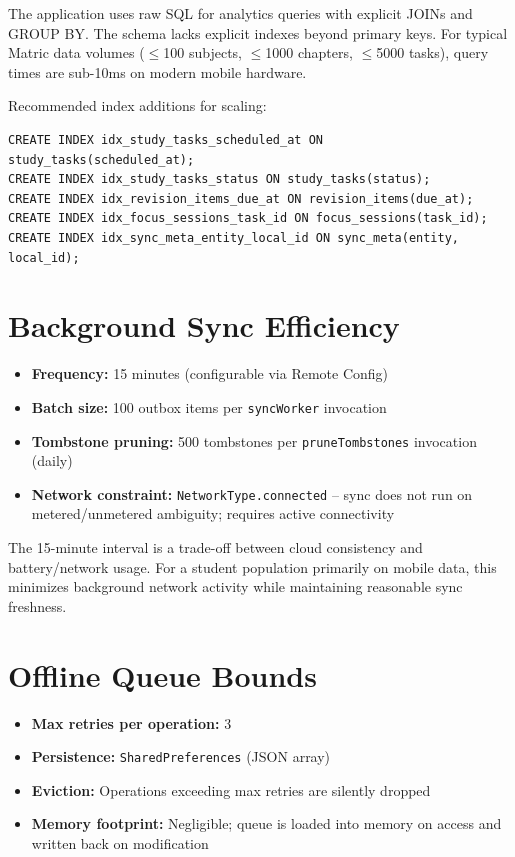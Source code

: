 \documentclass[12pt,a4paper,openany]{report}
\begin{document}
The application uses raw SQL for analytics queries with explicit JOINs and GROUP BY. The schema lacks explicit indexes beyond primary keys. For typical Matric data volumes ($\le$100 subjects, $\le$1000 chapters, $\le$5000 tasks), query times are sub-10ms on modern mobile hardware.

Recommended index additions for scaling:
\begin{verbatim}
CREATE INDEX idx_study_tasks_scheduled_at ON study_tasks(scheduled_at);
CREATE INDEX idx_study_tasks_status ON study_tasks(status);
CREATE INDEX idx_revision_items_due_at ON revision_items(due_at);
CREATE INDEX idx_focus_sessions_task_id ON focus_sessions(task_id);
CREATE INDEX idx_sync_meta_entity_local_id ON sync_meta(entity, local_id);
\end{verbatim}

\section{Background Sync Efficiency}

\begin{itemize}[leftmargin=*]
  \item \textbf{Frequency:} 15 minutes (configurable via Remote Config)
  \item \textbf{Batch size:} 100 outbox items per \texttt{syncWorker} invocation
  \item \textbf{Tombstone pruning:} 500 tombstones per \texttt{pruneTombstones} invocation (daily)
  \item \textbf{Network constraint:} \texttt{NetworkType.connected} -- sync does not run on metered/unmetered ambiguity; requires active connectivity
\end{itemize}

The 15-minute interval is a trade-off between cloud consistency and battery/network usage. For a student population primarily on mobile data, this minimizes background network activity while maintaining reasonable sync freshness.

\section{Offline Queue Bounds}

\begin{itemize}[leftmargin=*]
  \item \textbf{Max retries per operation:} 3
  \item \textbf{Persistence:} \texttt{SharedPreferences} (JSON array)
  \item \textbf{Eviction:} Operations exceeding max retries are silently dropped
  \item \textbf{Memory footprint:} Negligible; queue is loaded into memory on access and written back on modification
\end{itemize}
\end{document}
